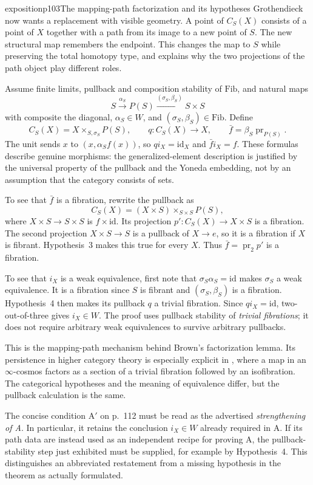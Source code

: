 \begin{dcomment}{exposition}{p103}{The mapping-path factorization and its hypotheses}
Grothendieck now wants a replacement with visible geometry. A point of $C_S(X)$ consists of a point of $X$ together with a path from its image to a new point of $S$. The new structural map remembers the endpoint. This changes the map to $S$ while preserving the total homotopy type, and explains why the two projections of the path object play different roles.

Assume finite limits, pullback and composition stability of $\mathrm{Fib}$, and natural maps
\[
 S\xrightarrow{\alpha_S}P(S)
 \xrightarrow{(\sigma_S,\beta_S)}S\times S
\]
with composite the diagonal, $\alpha_S\in W$, and $(\sigma_S,\beta_S)\in\mathrm{Fib}$. Define
\[
 C_S(X)=X\times_{S,\sigma_S}P(S),\qquad
 q:C_S(X)\to X,\qquad
 \bar f=\beta_S\operatorname{pr}_{P(S)}.
\]
The unit sends $x$ to $(x,\alpha_Sf(x))$, so $qi_X=\mathrm{id}_X$ and $\bar f i_X=f$. These formulas describe genuine morphisms: the generalized-element description is justified by the universal property of the pullback and the Yoneda embedding, not by an assumption that the category consists of sets.

To see that $\bar f$ is a fibration, rewrite the pullback as
\[
 C_S(X)=(X\times S)\times_{S\times S}P(S),
\]
where $X\times S\to S\times S$ is $f\times\mathrm{id}$. Its projection $p':C_S(X)\to X\times S$ is a fibration. The second projection $X\times S\to S$ is a pullback of $X\to e$, so it is a fibration if $X$ is fibrant. Hypothesis~3 makes this true for every $X$. Thus $\bar f=\operatorname{pr}_2p'$ is a fibration.

To see that $i_X$ is a weak equivalence, first note that $\sigma_S\alpha_S=\mathrm{id}$ makes $\sigma_S$ a weak equivalence. It is a fibration since $S$ is fibrant and $(\sigma_S,\beta_S)$ is a fibration. Hypothesis~4 then makes its pullback $q$ a trivial fibration. Since $qi_X=\mathrm{id}$, two-out-of-three gives $i_X\in W$. The proof uses pullback stability of \emph{trivial fibrations}; it does not require arbitrary weak equivalences to survive arbitrary pullbacks.

This is the mapping-path mechanism behind Brown's factorization lemma. Its persistence in higher category theory is especially explicit in \citet[Lemma~1.2.19]{RiehlVerity2022Elements}, where a map in an $\infty$-cosmos factors as a section of a trivial fibration followed by an isofibration. The categorical hypotheses and the meaning of equivalence differ, but the pullback calculation is the same.

The concise condition A$'$ on p.~112 must be read as the advertised \emph{strengthening of A}. In particular, it retains the conclusion $i_X\in W$ already required in A. If its path data are instead used as an independent recipe for proving A, the pullback-stability step just exhibited must be supplied, for example by Hypothesis~4. This distinguishes an abbreviated restatement from a missing hypothesis in the theorem as actually formulated.
\end{dcomment}

